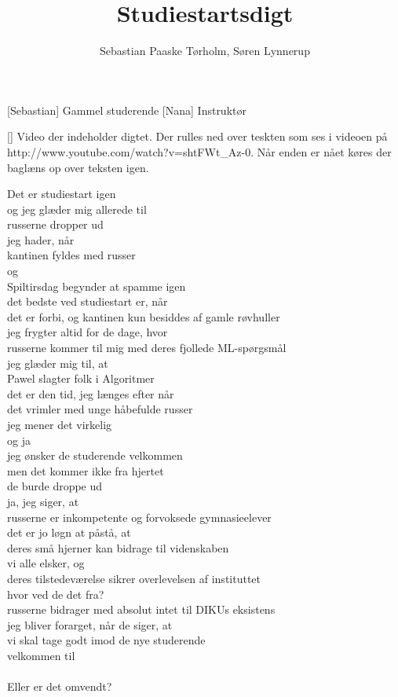 \documentclass[a4paper,11pt]{article}
\title{Studiestartsdigt}
\author{Sebastian Paaske Tørholm, Søren Lynnerup}
\begin{document}
\maketitle

\begin{roles}
  [Sebastian]  Gammel studerende
  [Nana] Instruktør
\end{roles}

\begin{props}
    [] Video der indeholder digtet. Der rulles ned over teskten som ses i videoen på http://www.youtube.com/watch?v=shtFWt\_Az-0. Når enden er nået køres der baglæns op over teksten igen.
\end{props}

\begin{sketch}

 Det er studiestart igen\\
og jeg glæder mig allerede til\\
russerne dropper ud\\
jeg hader, når\\
kantinen fyldes med russer\\
og\\
Spiltirsdag begynder at spamme igen\\
det bedste ved studiestart er, når\\
det er forbi, og kantinen kun besiddes af gamle røvhuller\\
jeg frygter altid for de dage, hvor\\
russerne kommer til mig med deres fjollede ML-spørgsmål\\
jeg glæder mig til, at\\
Pawel slagter folk i Algoritmer\\
det er den tid, jeg længes efter når\\
det vrimler med unge håbefulde russer\\
jeg mener det virkelig\\
og ja\\
jeg ønsker de studerende velkommen\\
men det kommer ikke fra hjertet\\
de burde droppe ud\\
ja, jeg siger, at\\
russerne er inkompetente og forvoksede gymnasieelever\\
det er jo løgn at påstå, at\\
deres små hjerner kan bidrage til videnskaben\\
vi alle elsker, og\\
deres tilstedeværelse sikrer overlevelsen af instituttet\\
hvor ved de det fra?\\
russerne bidrager med absolut intet til DIKUs eksistens\\
jeg bliver forarget, når de siger, at\\
vi skal tage godt imod de nye studerende\\
velkommen til\\
\\
Eller er det omvendt?


\end{sketch}
\end{document}
